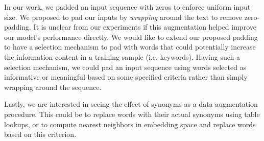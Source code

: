 In our work, we padded an input sequence with zeros to enforce uniform input size. We proposed to pad our inputs by \textit{wrapping}
around the text to remove zero-padding. It is unclear from our experiments if this augmentation helped improve our model's performance directly.
We would like to extend our proposed padding to have a selection mechanism to pad with words that could potentially increase the information content in a training
sample (i.e. keywords). Having such a selection mechanism, we could pad an input sequence using words selected as informative or meaningful based on
some specified criteria rather than simply wrapping around the sequence.

Lastly, we are interested in seeing the effect of synonyms as a data augmentation procedure. This could be to replace words with their
actual synonyms using table lookups, or to compute nearest neighbors in embedding space and replace words based on this criterion.
